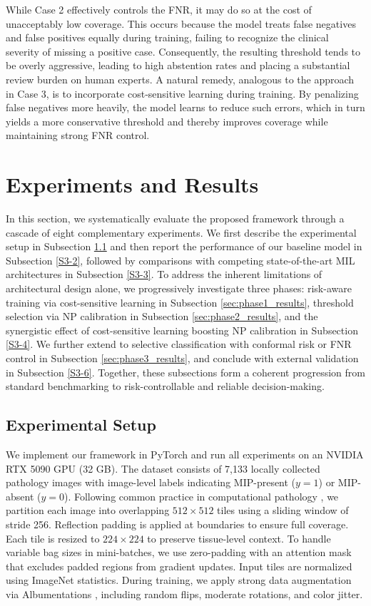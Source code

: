 \documentclass[journal]{IEEEtran}
\theoremstyle{remark}
\begin{document}
While Case 2 effectively controls the FNR, it may do so at the cost of unacceptably low coverage. This occurs because the model treats false negatives and false positives equally during training, failing to recognize the clinical severity of missing a positive case. Consequently, the resulting threshold tends to be overly aggressive, leading to high abstention rates and placing a substantial review burden on human experts. A natural remedy, analogous to the approach in Case 3, is to incorporate cost‑sensitive learning during training. By penalizing false negatives more heavily, the model learns to reduce such errors, which in turn yields a more conservative threshold and thereby improves coverage while maintaining strong FNR control.

\section{Experiments and Results}\label{sec:experiments}

In this section, we systematically evaluate the proposed framework through a cascade of eight complementary experiments. We first describe the experimental setup in Subsection \ref{S3-1} and then report the performance of our baseline model in Subsection \ref{S3-2}, followed by comparisons with competing state-of-the-art MIL architectures in Subsection \ref{S3-3}. To address the inherent limitations of architectural design alone, we progressively investigate three phases: risk-aware training via cost-sensitive learning in Subsection \ref{sec:phase1_results}, threshold selection via NP calibration in Subsection \ref{sec:phase2_results}, and the synergistic effect of cost-sensitive learning boosting NP calibration in Subsection \ref{S3-4}. We further extend to selective classification with conformal risk or FNR control in Subsection \ref{sec:phase3_results}, and conclude with external validation in Subsection \ref{S3-6}. Together, these subsections form a coherent progression from standard benchmarking to risk-controllable and reliable decision-making.

\subsection{Experimental Setup}\label{S3-1}

We implement our framework in PyTorch and run all experiments on an NVIDIA RTX 5090 GPU (32 GB). The dataset consists of 7,133 locally collected pathology images with image-level labels indicating MIP-present ($y = 1$) or MIP-absent ($y = 0$). Following common practice in computational pathology \cite{campanella2019clinical,lu2021data}, we partition each image into overlapping $512 \times 512$ tiles using a sliding window of stride 256. Reflection padding is applied at boundaries to ensure full coverage. Each tile is resized to $224 \times 224$ to preserve tissue-level context. To handle variable bag sizes in mini-batches, we use zero-padding with an attention mask that excludes padded regions from gradient updates. Input tiles are normalized using ImageNet statistics. During training, we apply strong data augmentation via Albumentations \cite{buslaev2020albumentations}, including random flips, moderate rotations, and color jitter.
\end{document}

